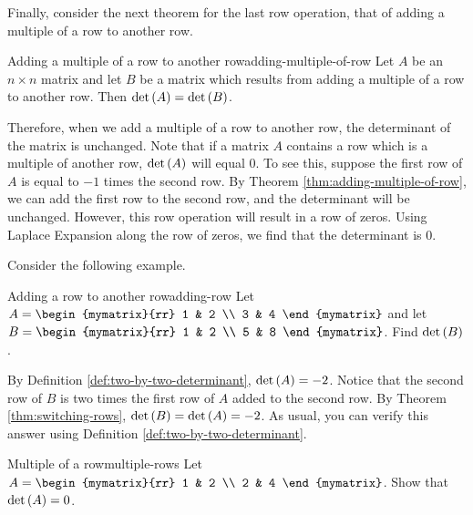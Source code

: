 Finally, consider the next theorem for the last row operation, that of adding a multiple of a row
to another row. 

\begin{theorem}{Adding a multiple of a row to another row}{adding-multiple-of-row}
Let $A$ be an $n\times n$ matrix and let $B$ be a matrix
which results from adding a multiple of a row to another row.
 Then $\det \left(A\right) =\det
\left(B \right) $.
\end{theorem}

Therefore, when we add a multiple of a row to another row, the determinant of the matrix is unchanged. 
Note that if a matrix $A$ contains a row which is a multiple of another row, $\det \left(A\right)$ will equal $0$. To see this,
suppose the first row of $A$ is equal to $-1$ times the second row. By Theorem \ref{thm:adding-multiple-of-row}, we can 
add the first row to the second row, and the determinant will be unchanged. However, this row operation will result in a row of zeros.
Using Laplace Expansion along the row of zeros, we find that the determinant is $0$. 

Consider the following example.

\begin{example}{Adding a row to another row}{adding-row}
Let $A=\begin{mymatrix}{rr}
1 & 2 \\
3 & 4
\end{mymatrix} $ and let $B=\begin{mymatrix}{rr}
1 & 2 \\
5 & 8
\end{mymatrix}$. 
Find $\det \left(B\right)$.
\end{example}

\begin{solution}
By Definition \ref{def:two-by-two-determinant}, $\det \left(A\right) = -2$. 
Notice that the second row of $B$ is two times the first row of $A$ added
to the second row. 
By Theorem \ref{thm:switching-rows}, $\det \left(B\right) = \det \left(A \right)
=-2$.
As usual, you can verify this answer using Definition \ref{def:two-by-two-determinant}.
\end{solution}

\begin{example}{Multiple of a row}{multiple-rows}
Let $A = \begin{mymatrix}{rr}
1 & 2 \\
2 & 4 
\end{mymatrix}$. Show that $\det \left(A \right) = 0$. 
\end{example}

